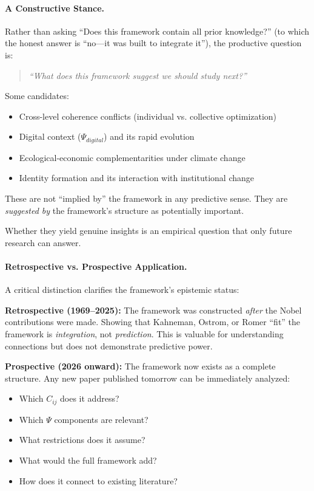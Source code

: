 \documentclass[12pt,a4paper]{article}
\begin{document}
\paragraph{A Constructive Stance.}
Rather than asking ``Does this framework contain all prior knowledge?''
(to which the honest answer is ``no---it was built to integrate it''),
the productive question is:

\begin{quote}
\emph{``What does this framework suggest we should study next?''}
\end{quote}

Some candidates:
\begin{itemize}
  \item Cross-level coherence conflicts (individual vs. collective optimization)
  \item Digital context ($\Psi_{digital}$) and its rapid evolution
  \item Ecological-economic complementarities under climate change
  \item Identity formation and its interaction with institutional change
\end{itemize}

These are not ``implied by'' the framework in any predictive sense.
They are \emph{suggested by} the framework's structure as potentially important.

Whether they yield genuine insights is an empirical question
that only future research can answer.

\paragraph{Retrospective vs. Prospective Application.}
A critical distinction clarifies the framework's epistemic status:

\textbf{Retrospective (1969--2025):} The framework was constructed \emph{after}
the Nobel contributions were made. Showing that Kahneman, Ostrom, or Romer
``fit'' the framework is \emph{integration}, not \emph{prediction}.
This is valuable for understanding connections but does not demonstrate
predictive power.

\textbf{Prospective (2026 onward):} The framework now exists as a complete
structure. Any new paper published tomorrow can be immediately analyzed:
\begin{itemize}
  \item Which $C_{ij}$ does it address?
  \item Which $\Psi$ components are relevant?
  \item What restrictions does it assume?
  \item What would the full framework add?
  \item How does it connect to existing literature?
\end{itemize}
\end{document}
